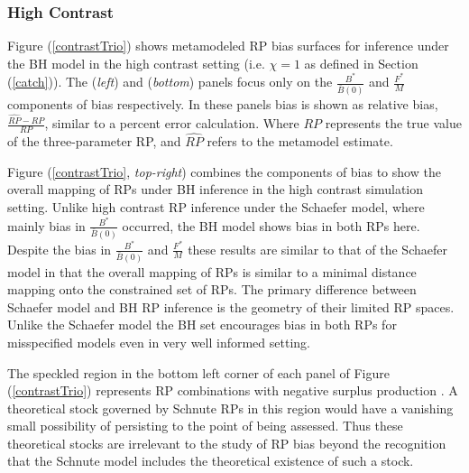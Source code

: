 \subsubsection{High Contrast \label{highConRes}}

%
Figure (\ref{contrastTrio}) shows metamodeled RP bias surfaces for inference
under the BH model in the high contrast setting (i.e. $\chi=1$ as defined in Section (\ref{catch})). 
The (\emph{left}) and (\emph{bottom}) panels focus only on the $\frac{B^*}{\bar B(0)}$ and
$\frac{F^*}{M}$ components of bias respectively. In these panels bias is shown
as relative bias, $\frac{\widehat{RP}-RP}{RP}$, similar to a percent error calculation.
Where $RP$ represents the true value of the three-parameter RP, and $\widehat{RP}$ 
refers to the metamodel estimate.

%
Figure (\ref{contrastTrio}, \emph{top-right}) combines the components of bias to
show the overall mapping of RPs under BH inference in the high contrast
simulation setting. Unlike high contrast RP inference under the Schaefer model,
where mainly bias in $\frac{B^*}{\bar B(0)}$ occurred, the BH model shows
bias in both RPs here. Despite the bias in $\frac{B^*}{\bar B(0)}$ and
$\frac{F^*}{M}$ these results are similar to that of the Schaefer model in
that the overall mapping of RPs is similar to a minimal distance mapping onto
the constrained set of RPs. %
The primary difference between Schaefer model and BH RP inference is the
geometry of their limited RP spaces. Unlike the Schaefer model the BH set
encourages bias in both RPs for misspecified models even in very well informed
setting.

%
The speckled region in the bottom left corner of each panel of Figure (\ref{contrastTrio}) 
represents RP combinations with negative surplus production \cite{myers_maximum_1999, punt_extending_2019}. 
A theoretical stock governed by Schnute RPs in this region would have a 
vanishing small possibility of persisting to the point of being assessed. 
Thus these theoretical stocks are irrelevant to the study of RP bias beyond 
the recognition that the Schnute model includes the theoretical existence of 
such a stock.  


%


